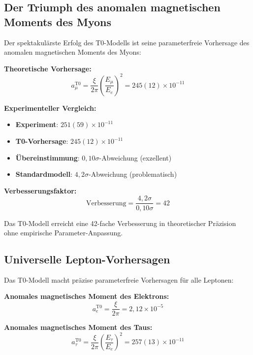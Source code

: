 \documentclass[12pt,a4paper]{report}
\begin{document}
	\subsection{Der Triumph des anomalen magnetischen Moments des Myons}
	\label{subsec:muon_triumph}
	
	Der spektakulärste Erfolg des T0-Modells ist seine parameterfreie Vorhersage des anomalen magnetischen Moments des Myons:
	
	\textbf{Theoretische Vorhersage:}
	\begin{equation}
		a_\mu^{\text{T0}} = \frac{\xi}{2\pi} \left(\frac{E_\mu}{E_e}\right)^2 = 245(12) \times 10^{-11}
	\end{equation}
	
	\textbf{Experimenteller Vergleich:}
	\begin{itemize}
		\item \textbf{Experiment}: $251(59) \times 10^{-11}$
		\item \textbf{T0-Vorhersage}: $245(12) \times 10^{-11}$
		\item \textbf{Übereinstimmung}: $0,10\sigma$-Abweichung (exzellent)
		\item \textbf{Standardmodell}: $4,2\sigma$-Abweichung (problematisch)
	\end{itemize}
	
	\textbf{Verbesserungsfaktor:}
	\begin{equation}
		\text{Verbesserung} = \frac{4,2\sigma}{0,10\sigma} = 42
	\end{equation}
	
	Das T0-Modell erreicht eine 42-fache Verbesserung in theoretischer Präzision ohne empirische Parameter-Anpassung.
	
	\subsection{Universelle Lepton-Vorhersagen}
	\label{subsec:universal_lepton_predictions}
	
	Das T0-Modell macht präzise parameterfreie Vorhersagen für alle Leptonen:
	
	\textbf{Anomales magnetisches Moment des Elektrons:}
	\begin{equation}
		a_e^{\text{T0}} = \frac{\xi}{2\pi} = 2,12 \times 10^{-5}
	\end{equation}
	
	\textbf{Anomales magnetisches Moment des Taus:}
	\begin{equation}
		a_\tau^{\text{T0}} = \frac{\xi}{2\pi} \left(\frac{E_\tau}{E_e}\right)^2 = 257(13) \times 10^{-11}
	\end{equation}
	
\end{document}
